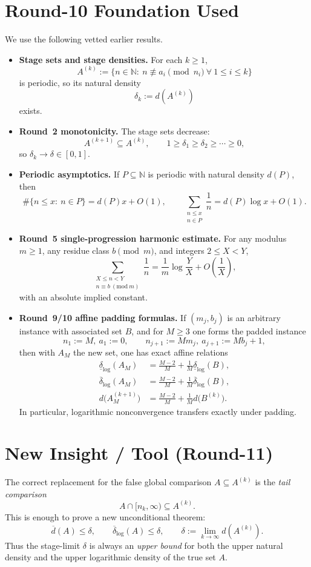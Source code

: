 \section{Round-10 Foundation Used}
We use the following vetted earlier results.
\begin{itemize}
\item \textbf{Stage sets and stage densities.}  For each $k\ge 1$,
\[
A^{(k)}:=\{n\in\mathbb N:\ n\not\equiv a_i\pmod{n_i}\ \forall\ 1\le i\le k\}
\]
is periodic, so its natural density
\[
\delta_k:=d(A^{(k)})
\]
exists.

\item \textbf{Round~2 monotonicity.}  The stage sets decrease:
\[
A^{(k+1)}\subseteq A^{(k)},
\qquad
1\ge \delta_1\ge \delta_2\ge \cdots \ge 0,
\]
so $\delta_k\to \delta\in[0,1]$.

\item \textbf{Periodic asymptotics.}  If $P\subseteq\mathbb N$ is periodic with natural density $d(P)$, then
\[
\#\{n\le x:\ n\in P\}=d(P)x+O(1),
\qquad
\sum_{\substack{n\le x\\ n\in P}}\frac1n=d(P)\log x+O(1).
\]

\item \textbf{Round~5 single-progression harmonic estimate.}  For any modulus $m\ge 1$, any residue class $b\pmod m$, and integers $2\le X<Y$,
\[
\sum_{\substack{X\le n<Y\\ n\equiv b\ (\mathrm{mod}\ m)}}\frac1n
=
\frac1m\log\frac{Y}{X}+O\!\left(\frac1X\right),
\]
with an absolute implied constant.

\item \textbf{Round~9/10 affine padding formulas.}  If $(m_j,b_j)$ is an arbitrary instance with associated set $B$, and for $M\ge 3$ one forms the padded instance
\[
 n_1:=M,\ a_1:=0,
 \qquad
 n_{j+1}:=Mm_j,\ a_{j+1}:=Mb_j+1,
\]
then with $A_M$ the new set, one has exact affine relations
\begin{align*}
\underline{\delta}_{\log}(A_M)
&=
\frac{M-2}{M}+\frac1M\underline{\delta}_{\log}(B),
\\
\overline{\delta}_{\log}(A_M)
&=
\frac{M-2}{M}+\frac1M\overline{\delta}_{\log}(B),
\\
d\bigl(A_M^{(k+1)}\bigr)
&=
\frac{M-2}{M}+\frac1M d\bigl(B^{(k)}\bigr).
\end{align*}
In particular, logarithmic nonconvergence transfers exactly under padding.
\end{itemize}

\section{New Insight / Tool (Round-11)}
The correct replacement for the false global comparison $A\subseteq A^{(k)}$ is the \emph{tail comparison}
\[
A\cap[n_k,\infty)\subseteq A^{(k)}.
\]
This is enough to prove a new unconditional theorem:
\begin{equation}
\overline d(A)\le \delta,
\qquad
\overline\delta_{\log}(A)\le \delta,
\qquad
\delta:=\lim_{k\to\infty} d(A^{(k)}).
\tag{11.1}
\end{equation}
Thus the stage-limit $\delta$ is always an \emph{upper bound} for both the upper natural density and the upper logarithmic density of the true set $A$.

